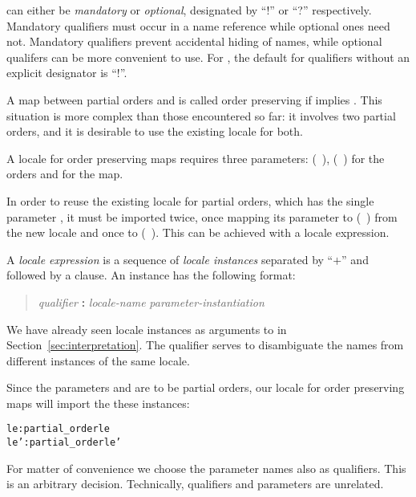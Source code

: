 \begin{isabellebody}
\begin{isamarkuptext}
  can either be \emph{mandatory} or \emph{optional}, designated by
  ``!'' or ``?'' respectively.  Mandatory qualifiers must occur in a
  name reference while optional ones need not.  Mandatory qualifiers
  prevent accidental hiding of names, while optional qualifers can be
  more convenient to use.  For , the
  default for qualifiers without an explicit designator is ``!''.%
\end{isamarkuptext}%
\isamarkuptrue%
%
\isamarkuptrue%
%
\begin{isamarkuptext}%
A map \isa{{\isasymphi}} between partial orders \isa{{\isasymsqsubseteq}} and \isa{{\isasympreceq}}
  is called order preserving if  implies .  This situation is more complex than those encountered so
  far: it involves two partial orders, and it is desirable to use the
  existing locale for both.

  A locale for order preserving maps requires three parameters:  (~\isa{{\isasymsqsubseteq}}), 
  (~\isa{{\isasympreceq}}) for the orders and \isa{{\isasymphi}} for the
  map.

  In order to reuse the existing locale for partial orders, which has
  the single parameter , it must be imported twice, once
  mapping its parameter to  (~\isa{{\isasymsqsubseteq}})
  from the new locale and once to 
  (~\isa{{\isasympreceq}}).  This can be achieved with a locale
  expression.

  A \emph{locale expression} is a sequence of \emph{locale instances}
  separated by ``$\textbf{+}$'' and followed by a 
  clause.
An instance has the following format:
\begin{quote}
  \textit{qualifier} \textbf{:} \textit{locale-name}
  \textit{parameter-instantiation}
\end{quote}
  We have already seen locale instances as arguments to
   in Section~\ref{sec:interpretation}.
  The qualifier serves to disambiguate the names from different
  instances of the same locale.

  Since the parameters  and  are to be partial
  orders, our locale for order preserving maps will import the these
  instances:
\begin{alltt}
  le: partial_order le
  le': partial_order le'
\end{alltt}
  For matter of convenience we choose the parameter names also as
  qualifiers.  This is an arbitrary decision.  Technically, qualifiers
  and parameters are unrelated.


\end{isamarkuptext}
\end{isabellebody}
